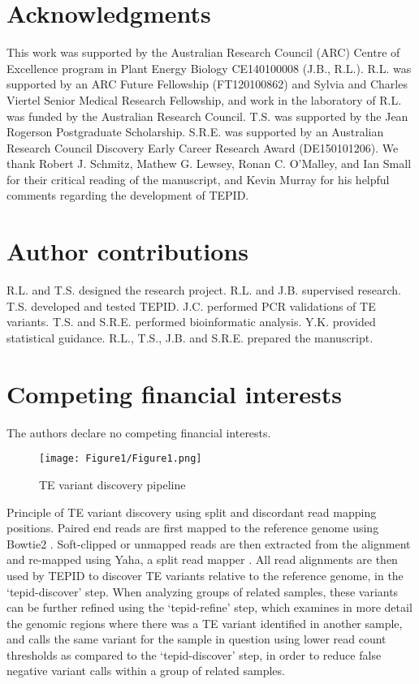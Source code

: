 \documentclass[12pt]{article}
\begin{document}
\section{Acknowledgments}

This work was supported by the Australian Research Council (ARC) Centre
of Excellence program in Plant Energy Biology CE140100008 (J.B., R.L.).
R.L. was supported by an ARC Future Fellowship (FT120100862) and Sylvia
and Charles Viertel Senior Medical Research Fellowship, and work in the
laboratory of R.L. was funded by the Australian Research Council. T.S.
was supported by the Jean Rogerson Postgraduate Scholarship. S.R.E. was
supported by an Australian Research Council Discovery Early Career
Research Award (DE150101206). We thank Robert J. Schmitz, Mathew G.
Lewsey, Ronan C. O'Malley, and Ian Small for their critical reading of
the manuscript, and Kevin Murray for his helpful comments regarding the
development of TEPID.

\section{Author contributions}

R.L. and T.S. designed the research project. R.L. and J.B. supervised
research. T.S. developed and tested TEPID. J.C. performed PCR
validations of TE variants. T.S. and S.R.E. performed bioinformatic
analysis. Y.K. provided statistical guidance. R.L., T.S., J.B. and
S.R.E. prepared the manuscript.

\section{Competing financial interests}

The authors declare no competing financial interests.

\pagebreak

\printbibliography

\pagebreak

\begin{figure}[h]
  \centering
  \texttt{[image: Figure1/Figure1.png]}
  \caption{TE variant discovery pipeline}
  \label{fig1}
\end{figure}

Principle of TE variant discovery using split and discordant read
mapping positions. Paired end reads are first mapped to the reference
genome using Bowtie2 \cite{Langmead:2012jh}. Soft-clipped or unmapped
reads are then extracted from the alignment and re-mapped using Yaha, a
split read mapper \cite{Faust:2012ic}. All read alignments are then used
by TEPID to discover TE variants relative to the reference genome, in
the `tepid-discover' step. When analyzing groups of related samples,
these variants can be further refined using the `tepid-refine' step,
which examines in more detail the genomic regions where there was a TE
variant identified in another sample, and calls the same variant for the
sample in question using lower read count thresholds as compared to the
`tepid-discover' step, in order to reduce false negative variant calls
within a group of related samples.
\end{document}
